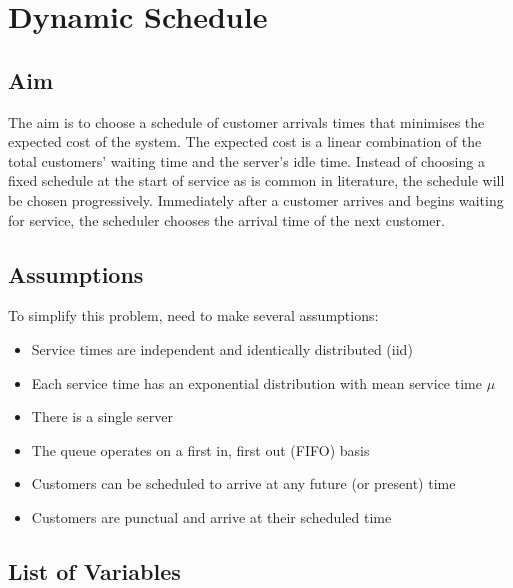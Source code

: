 \chapter{Dynamic Schedule}

\section{Aim}

The aim is to choose a schedule of customer arrivals times that minimises the expected cost of the system. The expected cost is a linear combination of the total customers' waiting time and the server's idle time. Instead of choosing a fixed schedule at the start of service as is common in literature, the schedule will be chosen progressively. Immediately after a customer arrives and begins waiting for service, the scheduler chooses the arrival time of the next customer.

\section{Assumptions}

To simplify this problem, need to make several assumptions:

\begin{itemize}
	\item Service times are independent and identically distributed (iid)
	\item Each service time has an exponential distribution with mean service time $\mu$
	\item There is a single server
	\item The queue operates on a first in, first out (FIFO) basis
	\item Customers can be scheduled to arrive at any future (or present) time
	\item Customers are punctual and arrive at their scheduled time
\end{itemize}

\section{List of Variables}

